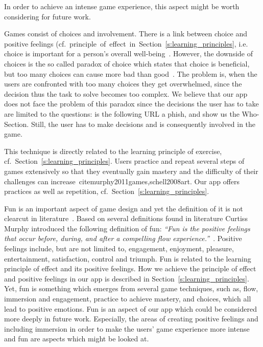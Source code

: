 \begin{description}[leftmargin=0cm]
In order to achieve an intense game experience, this aspect might be worth considering for future work.
	\item[Choice and Involvement]
Games consist of choices and involvement. 
There is a link between choice and positive feelings (cf.~principle~of~effect~in~Section~\ref{s:learning_principles}, i.e. choice is important for a person's overall well-being~\cite{seligman2012flourish, schwartz2009paradox}.
However, the downside of choices is the so called paradox of choice which states that choice is beneficial, but too many choices can cause more bad than good~\cite{schwartz2009paradox}.
The problem is, when the users are confronted with too many choices they get overwhelmed, since the decision thus the task to solve becomes too complex.
We believe that our app does not face the problem of this paradox since the decisions the user has to take are limited to the questions:
is the following URL a phish, and show us the Who-Section.
Still, the user has to make decisions and is consequently involved in the game.
	\item[Practice] This technique is directly related to the learning principle of exercise, cf.~Section~\ref{s:learning_principles}. 
Users practice and repeat several steps of games extensively so that they eventually gain mastery and the difficulty of their challenges can increase~cite{murphy2011games,schell2008art}. 
Our app offers practices as well as repetition, cf.~Section~\ref{s:learning_principles}.
	\item[Fun] Fun is an important aspect of game design and yet the definition of it is not clearcut in literature~\cite{murphy2011games, schell2008art,koster2010theory}.
Based on several definitions found in literature Curtiss Murphy introduced the following definition of fun: \textit{``Fun is the positive feelings that occur before, during, and after a compelling flow experience.''}~\cite{murphy2011games}.
Positive feelings include, but are not limited to, engagement, enjoyment, pleasure, entertainment, satisfaction, control and triumph. 
Fun is related to the learning principle of effect and its positive feelings.
How we achieve the principle of effect and positive feelings in our app is described in Section~\ref{s:learning_principles}.
Yet, fun is something which emerges from several game techniques, such as, flow, immersion and engagement, practice to achieve mastery, and choices, which all lead to positive emotions.
Fun is an aspect of our app which could be considered more deeply in future work. 
Especially, the areas of creating positive feelings and including immersion in order to make the users' game experience more intense and fun are aspects which might be looked at.
\end{description}
